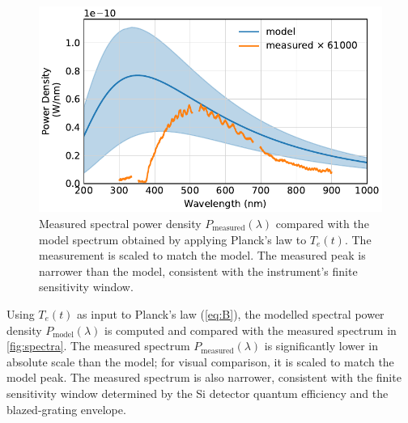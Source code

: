 \documentclass[
	parskip=half,
	a4paper,
]{scrarticle}
\begin{document}
\begin{figure}
    \centering
    \includegraphics{../analysis/figures/spectrum de.pdf}
    \caption{Measured spectral power density \(P_\text{measured}(\lambda)\) compared with the model spectrum obtained by applying Planck’s law to \(T_e(t)\). The measurement is scaled to match the model. The measured peak is narrower than the model, consistent with the instrument’s finite sensitivity window.}
    \label{fig:spectra}
\end{figure}
Using \(T_e(t)\) as input to Planck’s law (\autoref{eq:B}), the modelled spectral power density \(P_\text{model}(\lambda)\) is computed and compared with the measured spectrum in \autoref{fig:spectra}. The measured spectrum \(P_\text{measured}(\lambda)\) is significantly lower in absolute scale than the model; for visual comparison, it is scaled to match the model peak. The measured spectrum is also narrower, consistent with the finite sensitivity window determined by the Si detector quantum efficiency and the blazed-grating envelope.
\end{document}
